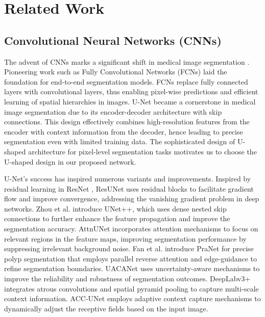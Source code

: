 \section{Related Work}
\label{sec:related_work}


\subsection{Convolutional Neural Networks (CNNs)}
The advent of CNNs marks a significant shift in medical image segmentation \cite{ronneberger2015u, oktay2018attention, zhou2018unet++, fan2020pranet, kim2021uacanet, chen2017deeplab}. Pioneering work such as Fully Convolutional Networks (FCNs) \cite{long2015fully} laid the foundation for end-to-end segmentation models. FCNs replace fully connected layers with convolutional layers, thus enabling pixel-wise predictions and efficient learning of spatial hierarchies in images. U-Net \cite{ronneberger2015u} became a cornerstone in medical image segmentation due to its encoder-decoder architecture with skip connections. This design effectively combines high-resolution features from the encoder with context information from the decoder, hence leading to precise segmentation even with limited training data. The sophisticated design of U-shaped architecture for pixel-level segmentation tasks motivates us to choose the U-shaped design in our proposed network.

U-Net's success has inspired numerous variants and improvements. Inspired by residual learning in ResNet \cite{he2016deep}, ResUNet \cite{zhang2018road} uses residual blocks to facilitate gradient flow and improve convergence, addressing the vanishing gradient problem in deep networks. Zhou et al.\cite{zhou2018unet++} introduce UNet++, which uses dense nested skip connections to further enhance the feature propagation and improve the segmentation accuracy. AttnUNet \cite{oktay2018attention} incorporates attention mechanisms to focus on relevant regions in the feature maps, improving segmentation performance by suppressing irrelevant background noise. Fan et al. \cite{fan2020pranet} introduce PraNet for precise polyp segmentation that employs parallel reverse attention and edge-guidance to refine segmentation boundaries. UACANet \cite{kim2021uacanet} uses uncertainty-aware mechanisms to improve the reliability and robustness of segmentation outcomes. DeepLabv3+ \cite{chen2017deeplab} integrates atrous convolutions and spatial pyramid pooling to capture multi-scale context information. ACC-UNet \cite{ibtehaz2023acc} employs adaptive context capture mechanisms to dynamically adjust the receptive fields based on the input image.

